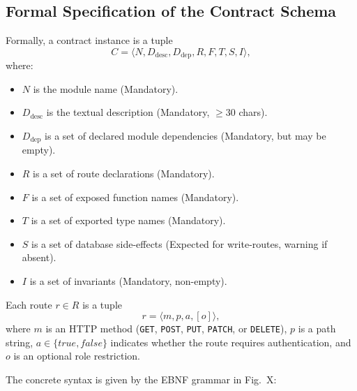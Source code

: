 \subsection{Formal Specification of the Contract Schema}
\label{sec:contract-schema}

Formally, a contract instance is a tuple
\begin{equation}
  C = \langle N, D_{\text{desc}}, D_{\text{dep}}, R, F, T, S, I \rangle,
  \label{eq:contract-tuple}
\end{equation}
where:
\begin{itemize}
    \item $N$ is the module name (Mandatory).
    \item $D_{\text{desc}}$ is the textual description (Mandatory, $\ge 30$ chars).
    \item $D_{\text{dep}}$ is a set of declared module dependencies (Mandatory, but may be empty).
    \item $R$ is a set of route declarations (Mandatory).
    \item $F$ is a set of exposed function names (Mandatory).
    \item $T$ is a set of exported type names (Mandatory).
    \item $S$ is a set of database side-effects (Expected for write-routes, warning if absent).
    \item $I$ is a set of invariants (Mandatory, non-empty).
\end{itemize}

Each route $r \in R$ is a tuple
\begin{equation}
  r = \langle m, p, a, [o] \rangle,
  \label{eq:route-tuple}
\end{equation}
where $m$ is an HTTP method (\texttt{GET}, \texttt{POST}, \texttt{PUT}, \texttt{PATCH}, or \texttt{DELETE}), $p$ is a path string, $a \in \{\mathit{true}, \mathit{false}\}$ indicates whether the route requires authentication, and $o$ is an optional role restriction.

The concrete syntax is given by the EBNF grammar in Fig.~X:


